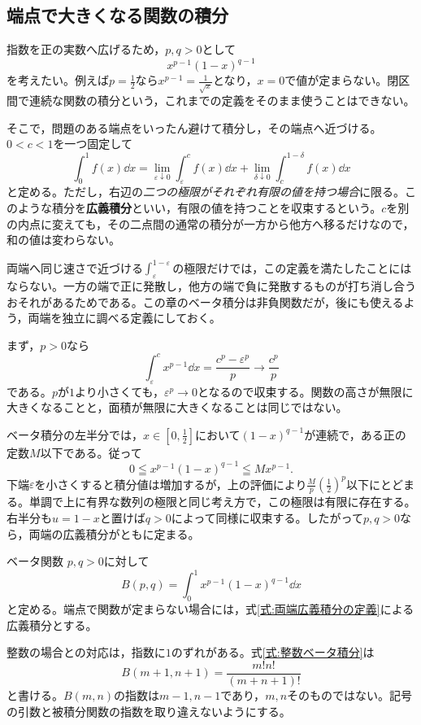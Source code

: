 \subsection{端点で大きくなる関数の積分}

指数を正の実数へ広げるため，$p,q>0$として
\[
 x^{p-1}(1-x)^{q-1}
\]
を考えたい。例えば$p=\frac12$なら$x^{p-1}=\frac1{\sqrt x}$となり，$x=0$で値が定まらない。閉区間で連続な関数の積分という，これまでの定義をそのまま使うことはできない。

そこで，問題のある端点をいったん避けて積分し，その端点へ近づける。$0<c<1$を一つ固定して
\begin{equation}\label{式:両端広義積分の定義}
 \int_0^1 f(x)\dd x
 =\lim_{\varepsilon\downarrow0}\int_{\varepsilon}^{c}f(x)\dd x
  +\lim_{\delta\downarrow0}\int_c^{1-\delta}f(x)\dd x
\end{equation}
と定める。ただし，右辺の\emph{二つの極限がそれぞれ有限の値を持つ場合}に限る。このような積分を\textbf{広義積分}といい，有限の値を持つことを収束するという。$c$を別の内点に変えても，その二点間の通常の積分が一方から他方へ移るだけなので，和の値は変わらない。

両端へ同じ速さで近づける$\int_{\varepsilon}^{1-\varepsilon}$の極限だけでは，この定義を満たしたことにはならない。一方の端で正に発散し，他方の端で負に発散するものが打ち消し合うおそれがあるためである。この章のベータ積分は非負関数だが，後にも使えるよう，両端を独立に調べる定義にしておく。

まず，$p>0$なら
\[
 \int_{\varepsilon}^{c}x^{p-1}\dd x
 =\frac{c^p-\varepsilon^p}{p}
 \longrightarrow\frac{c^p}{p}
\]
である。$p$が$1$より小さくても，$\varepsilon^p\to0$となるので収束する。関数の高さが無限に大きくなることと，面積が無限に大きくなることは同じではない。

ベータ積分の左半分では，$x\in\left[0,\frac12\right]$において$(1-x)^{q-1}$が連続で，ある正の定数$M$以下である。従って
\[
 0\leqq x^{p-1}(1-x)^{q-1}\leqq Mx^{p-1}.
\]
下端$\varepsilon$を小さくすると積分値は増加するが，上の評価により$\frac{M}{p}\left(\frac12\right)^p$以下にとどまる。単調で上に有界な数列の極限と同じ考え方で，この極限は有限に存在する。右半分も$u=1-x$と置けば$q>0$によって同様に収束する。したがって$p,q>0$なら，両端の広義積分がともに定まる。

\begin{definition}{ベータ関数}
$p,q>0$に対して
\begin{equation}\label{式:ベータ関数の定義}
 B(p,q)=\int_0^1x^{p-1}(1-x)^{q-1}\dd x
\end{equation}
と定める。端点で関数が定まらない場合には，式\eqref{式:両端広義積分の定義}による広義積分とする。
\end{definition}

整数の場合との対応は，指数に$1$のずれがある。式\eqref{式:整数ベータ積分}は
\[
 B(m+1,n+1)=\frac{m!n!}{(m+n+1)!}
\]
と書ける。$B(m,n)$の指数は$m-1,n-1$であり，$m,n$そのものではない。記号の引数と被積分関数の指数を取り違えないようにする。

